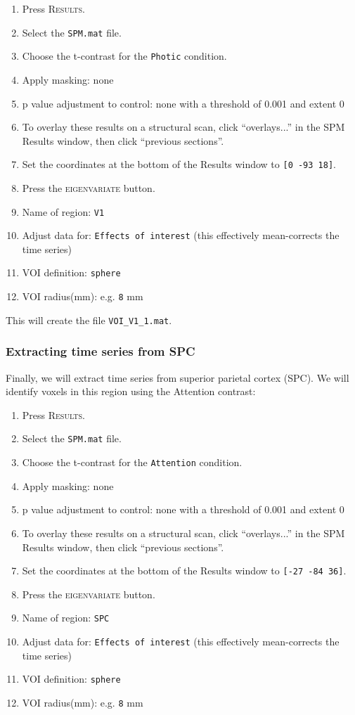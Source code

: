 \begin{enumerate}
	\item Press \textsc{Results}.
	\item Select the \texttt{SPM.mat} file.
	\item Choose the t-contrast for the \texttt{Photic} condition.
	\item Apply masking: none
	\item p value adjustment to control: none with a threshold of 0.001 and extent 0
	\item To overlay these results on a structural scan, click ``overlays...'' in the SPM Results window, then click ``previous sections''.
	\item Set the coordinates at the bottom of the Results window to \texttt{[0 -93 18]}.
	\item Press the \textsc{eigenvariate} button.
	\item Name of region: \texttt{V1}
	\item Adjust data for: \texttt{Effects of interest} (this effectively mean-corrects the time series)
	\item VOI definition: \texttt{sphere}
	\item VOI radius(mm): e.g. \texttt{8} mm
\end{enumerate}

This will create the file \texttt{VOI\_V1\_1.mat}. 

\subsubsection{Extracting time series from SPC}

Finally, we will extract time series from superior parietal cortex (SPC). We will identify voxels in this region using the Attention contrast:

\begin{enumerate}
	\item Press \textsc{Results}.
	\item Select the \texttt{SPM.mat} file.
	\item Choose the t-contrast for the \texttt{Attention} condition.
	\item Apply masking: none
	\item p value adjustment to control: none with a threshold of 0.001 and extent 0
	\item To overlay these results on a structural scan, click ``overlays...'' in the SPM Results window, then click ``previous sections''.
	\item Set the coordinates at the bottom of the Results window to \texttt{[-27 -84 36]}.
	\item Press the \textsc{eigenvariate} button.
	\item Name of region: \texttt{SPC}
	\item Adjust data for: \texttt{Effects of interest} (this effectively mean-corrects the time series)
	\item VOI definition: \texttt{sphere}
	\item VOI radius(mm): e.g. \texttt{8} mm
\end{enumerate}

